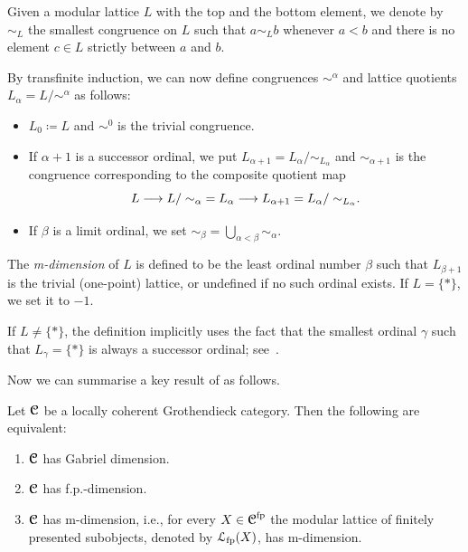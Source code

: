 \documentclass[reqno,a4paper]{amsart}
\begin{document}
\begin{definition}[{\cite[\S7.2]{pp}}]\label{def:m-dim}
Given a modular lattice $L$ with the top and the bottom element, we denote by $\sim_L$ the smallest congruence on $L$ such that $a\sim_L b$ whenever $a<b$ and there is no element $c\in L$ strictly between $a$ and $b$.

By transfinite induction, we can now define congruences $\sim^\alpha$ and lattice quotients $L_\alpha=L/\sim^\alpha$ as follows:
\begin{itemize}
\item $L_0\coloneqq L$ and $\sim^0$ is the trivial congruence.
\item If $\alpha+1$ is a successor ordinal, we put $L_{\alpha+1} = L_\alpha/\sim_{L_\alpha}$ and $\sim_{\alpha+1}$ is the congruence corresponding to the composite quotient map
\[ L\longrightarrow {L/\sim_\alpha}=L_\alpha\longrightarrow L_{\alpha+1}={L_\alpha/\sim_{L_\alpha}}. \]
\item If $\beta$ is a limit ordinal, we set $\sim_\beta=\bigcup_{\alpha<\beta}\sim_\alpha$.
\end{itemize}
The \emph{m-dimension} of $L$ is defined to be the least ordinal number $\beta$ such that $L_{\beta+1}$ is the trivial (one-point) lattice, or undefined if no such ordinal exists. If $L=\{*\}$, we set it to $-1$.
\end{definition}

\begin{remark}\label{rem:m-dim}
If $L\neq\{*\}$, the definition implicitly uses the fact that the smallest ordinal $\gamma$ such that $L_\gamma=\{*\}$ is always a successor ordinal; see~\cite[\S7.1, p.~282]{pp}.
\end{remark}

Now we can summarise a key result of \cite{bur01} as follows.
\begin{theorem}\label{thm:kgforcoherent}
    Let $\operatorname{\boldsymbol{\mathcal{C}}}$ be a locally coherent Grothendieck category. Then the following are equivalent:
    \begin{enumerate}
        \item $\operatorname{\boldsymbol{\mathcal{C}}}$ has Gabriel dimension.
        \item $\operatorname{\boldsymbol{\mathcal{C}}}$ has f.p.-dimension.
        \item $\operatorname{\boldsymbol{\mathcal{C}}}$ has m-dimension, i.e., for every $X\in\operatorname{\boldsymbol{\mathcal{C}}}^{\mathrm{fp}}$ the modular lattice of finitely presented subobjects, denoted by $\mathcal{L}_{\mathrm{fp}}(X)$, has m-dimension.
    \end{enumerate}
\end{theorem}
\end{document}
